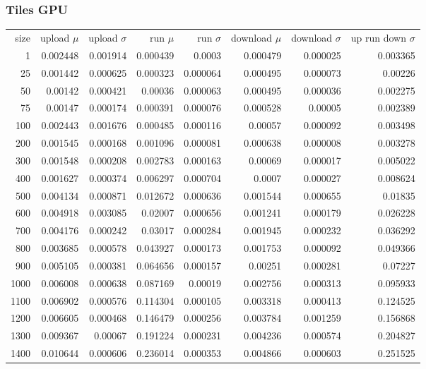 \subsubsection{Tiles GPU}

\begin{longtable}{r r r r r r r r}
size & upload $\mu$  & upload $\sigma$ & run $\mu$ & run $\sigma$ & download $\mu$ & download $\sigma$ & up run down $\sigma$ \\
1 & 0.002448 & 0.001914 & 0.000439 & 0.0003 & 0.000479 & 0.000025 & 0.003365 \\
25 & 0.001442 & 0.000625 & 0.000323 & 0.000064 & 0.000495 & 0.000073 & 0.00226 \\
50 & 0.00142 & 0.000421 & 0.00036 & 0.000063 & 0.000495 & 0.000036 & 0.002275 \\
75 & 0.00147 & 0.000174 & 0.000391 & 0.000076 & 0.000528 & 0.00005 & 0.002389 \\
100 & 0.002443 & 0.001676 & 0.000485 & 0.000116 & 0.00057 & 0.000092 & 0.003498 \\
200 & 0.001545 & 0.000168 & 0.001096 & 0.000081 & 0.000638 & 0.000008 & 0.003278 \\
300 & 0.001548 & 0.000208 & 0.002783 & 0.000163 & 0.00069 & 0.000017 & 0.005022 \\
400 & 0.001627 & 0.000374 & 0.006297 & 0.000704 & 0.0007 & 0.000027 & 0.008624 \\
500 & 0.004134 & 0.000871 & 0.012672 & 0.000636 & 0.001544 & 0.000655 & 0.01835 \\
600 & 0.004918 & 0.003085 & 0.02007 & 0.000656 & 0.001241 & 0.000179 & 0.026228 \\
700 & 0.004176 & 0.000242 & 0.03017 & 0.000284 & 0.001945 & 0.000232 & 0.036292 \\
800 & 0.003685 & 0.000578 & 0.043927 & 0.000173 & 0.001753 & 0.000092 & 0.049366 \\
900 & 0.005105 & 0.000381 & 0.064656 & 0.000157 & 0.00251 & 0.000281 & 0.07227 \\
1000 & 0.006008 & 0.000638 & 0.087169 & 0.00019 & 0.002756 & 0.000313 & 0.095933 \\
1100 & 0.006902 & 0.000576 & 0.114304 & 0.000105 & 0.003318 & 0.000413 & 0.124525 \\
1200 & 0.006605 & 0.000468 & 0.146479 & 0.000256 & 0.003784 & 0.001259 & 0.156868 \\
1300 & 0.009367 & 0.00067 & 0.191224 & 0.000231 & 0.004236 & 0.000574 & 0.204827 \\
1400 & 0.010644 & 0.000606 & 0.236014 & 0.000353 & 0.004866 & 0.000603 & 0.251525 \\

\end{longtable}

